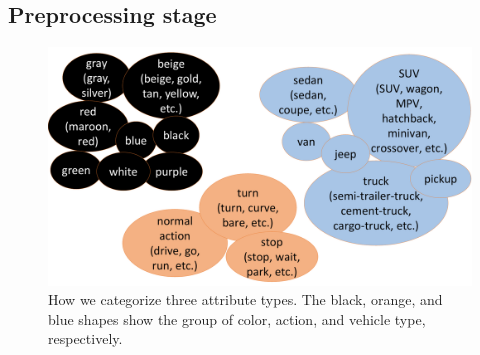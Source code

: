 \subsection{Preprocessing stage}
\begin{figure} [!htb]
    \centering
    \includegraphics[width=\textwidth]{images/methods/group_example.pdf}
    \caption{How we categorize three attribute types. The black, orange, and blue shapes show the group of color, action, and vehicle type, respectively.}
    \label{fig:group_example}
\end{figure}

